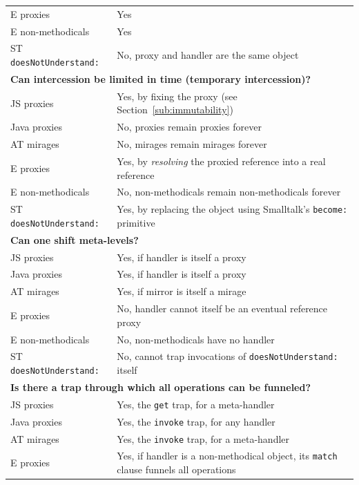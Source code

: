 \documentclass{sig-alternate}
\begin{document}
\begin{table}
\begin{tabular}{|p{}|p{}|}
    E proxies         & Yes\\
    E non-methodicals & Yes\\
    ST \texttt{doesNotUnderstand:}  & No, proxy and handler are the same object\\
    \hline
    \multicolumn{2}{|l|}{\textbf{Can intercession be limited in time (temporary intercession)?}}\\
    \hline
    JS proxies        & Yes, by fixing the proxy (see Section~\ref{sub:immutability})\\
    Java proxies      & No, proxies remain proxies forever\\
    AT mirages        & No, mirages remain mirages forever\\
    E proxies         & Yes, by \emph{resolving} the proxied reference into a real reference\\
    E non-methodicals & No, non-methodicals remain non-methodicals forever\\
    ST \texttt{doesNotUnderstand:}  & Yes, by replacing the object using Smalltalk's \texttt{become:} primitive\\
    \hline
    \multicolumn{2}{|l|}{\textbf{Can one shift meta-levels?}}\\
    \hline
    JS proxies        & Yes, if handler is itself a proxy\\
    Java proxies      & Yes, if handler is itself a proxy\\
    AT mirages        & Yes, if mirror is itself a mirage\\
    E proxies         & No, handler cannot itself be an eventual reference proxy\\
    E non-methodicals & No, non-methodicals have no handler\\
    ST \texttt{doesNotUnderstand:}  & No, cannot trap invocations of \texttt{doesNotUnderstand:} itself\\
    \hline
    \multicolumn{2}{|l|}{\textbf{Is there a trap through which all operations can be funneled?}}\\
    \hline
    JS proxies        & Yes, the \texttt{get} trap, for a meta-handler\\
    Java proxies      & Yes, the \texttt{invoke} trap, for any handler\\
    AT mirages        & Yes, the \texttt{invoke} trap, for a meta-handler\\
    E proxies         & Yes, if handler is a non-methodical object, its \texttt{match} clause funnels all operations\\

\end{tabular}
\end{table}
\end{document}

